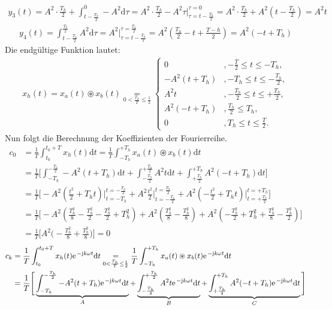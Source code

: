 \documentclass[11pt,a4paper,DIV=12]{scrartcl}
\newcommand{\diff}{\mathrm{d}}
\begin{document}
\begin{align}
	y_3(t)=A^2\cdot\frac{T_h}{2}+\int_{t-\frac{T_h}{2}}^{0}-A^2\diff \tau=A^2\cdot\frac{T_h}{2}-A^2\tau\Bigg |_{\tau=t-\frac{T_h}{2}}^{\tau=0}=A^2\cdot\frac{T_h}{2}+A^2(t-\frac{T_h}{2})=A^2t
\end{align}
\begin{align}
	y_4(t)=\int_{t-\frac{T_h}{2}}^{\frac{T_h}{2}}A^2\diff \tau=A^2\Bigg |_{\tau=t-\frac{T_h}{2}}^{\tau=\frac{T_h}{2}}=A^2(\frac{T_h}{2}-t+\frac{T-h}{2})=A^2(-t+T_h)
\end{align}
Die endgültige Funktion lautet:
\begin{align}
	x_{h}(t)=x_{a}(t)\circledast x_{b}(t)\underset{0<\frac{T_h}{T}\leq\frac{1}{2}}{=}\begin{cases}
		0 &, -\frac{T}{2}\leq t \leq -T_h, \\
		-A^2(t+T_h) &,-T_h\leq t \leq -\frac{T_h}{2}, \\
		A^2t &, -\frac{T_h}{2} \leq t \leq +\frac{T_h}{2}, \\
		A^2(-t+T_h) &, \frac{T_h}{2}\leq T_h, \\
		0 &, T_h \leq t \leq \frac{T}{2}.
	\end{cases}
\end{align}
Nun folgt die Berechnung der Koeffizienten der Fourierreihe.
\begin{align}
	c_0&=\frac{1}{T}\int_{t_0}^{t_0+T}x_{h}(t)\diff t=\frac{1}{T}\int_{-T_h}^{+T_h}x_{a}(t)\circledast x_{b}(t)\diff t \nonumber \\
	&=\frac{1}{T}\Bigg [\int_{-T_h}^{-\frac{T_h}{2}}-A^2(t+T_h)\diff t+\int_{-\frac{T_h}{2}}^{+\frac{T_h}{2}}A^2t\diff t+\int_{+\frac{T_h}{2}}^{+T_h}A^2(-t+T_h)\diff t\Bigg ]\nonumber \\
	&=\frac{1}{T}\Bigg [-A^2(\frac{t^2}{2}+T_ht)\Bigg |_{t=-T_h}^{t=-\frac{T_h}{2}}+A^2\frac{t^2}{2}\Bigg |_{t=-\frac{T_h}{2}}^{t=\frac{T_h}{2}} + A^2(-\frac{t^2}{2}+T_ht)\Bigg |_{t=+\frac{T_h}{2}}^{t=+T_h}\Bigg ]\nonumber \\
	&=\frac{1}{T}\Bigg [-A^2(\frac{T_h^2}{8}-\frac{T_h^2}{2}-\frac{T_h^2}{2}+T_h^2)+A^2(\frac{T_h^2}{8}-\frac{T_h^2}{8})+A^2(-\frac{T_h^2}{2}+T_h^2+\frac{T_h^2}{8}-\frac{T_h^2}{2})\Bigg ] \nonumber \\
	&=\frac{1}{T} \Bigg [A^2\bigg (-\frac{T_h^2}{8}+\frac{T_h^2}{8}\bigg )\Bigg ]=0
\end{align}
\begin{align}
	c_k&=\frac{1}{T}\int_{t_0}^{t_0+T}x_{h}(t)\e^{-\im k \omega t}\diff t\underset{0<\frac{T_h}{T}\leq \frac{1}{2}}{=}\frac{1}{T}\int_{-T_h}^{+T_h}x_{a}(t)\circledast x_{b}(t)\e^{-\im k \omega t}\diff t \nonumber \\
	&=\frac{1}{T}\Bigg [\underbrace{\int_{-T_h}^{-\frac{T_h}{2}}-A^2(t+T_h)\e^{-\im k \omega t}\diff t}_A+\underbrace{\int_{-\frac{T_h}{2}}^{+\frac{T_h}{2}}A^2t\e^{-\im k \omega t}\diff t}_B+\underbrace{\int_{+\frac{T_h}{2}}^{+T_h}A^2(-t+T_h)\e^{-\im k \omega t}\diff t}_C\Bigg ]
\end{align}
\end{document}
